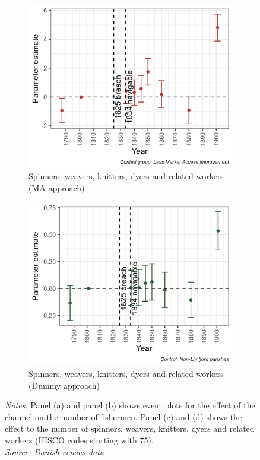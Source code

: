 \begin{figure}[h!]
\begin{subfigure}[b]{0.45\textwidth}
    \end{subfigure}
    \vspace{0.45cm}
    \begin{subfigure}[b]{0.45\textwidth}
        \centering
        \caption{\label{fig:migr} Spinners, weavers, knitters, dyers and related workers (MA approach)}
        \includegraphics[width=\textwidth]{Plots/Mechanism/spinning_MA.png}
    \end{subfigure}
    \hfill
    \begin{subfigure}[b]{0.45\textwidth}
        \centering
        \caption{\label{fig:fert} Spinners, weavers, knitters, dyers and related workers (Dummy approach)}
        \includegraphics[width=\textwidth]{Plots/Mechanism/spinning_dummy.png}
    \end{subfigure}
    \parbox{0.9\textwidth}{
    \caption*{\footnotesize \textit{Notes:} Panel (a) and panel (b) shows event plots for the effect of the channel on the number of fishermen. Panel (c) and (d) shows the effect to the number of spinners, weavers, knitters, dyers and related workers (HISCO codes starting with 75).  \\ \textit{Source: Danish census data}}
}
    \label{fig:fishing_spinners}
\end{figure}

